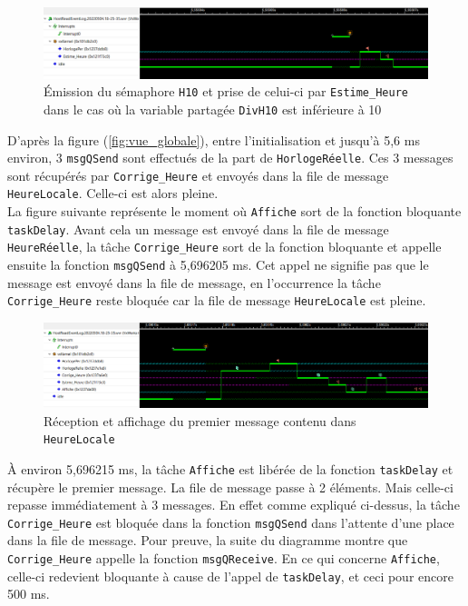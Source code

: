 \documentclass[french]{article}
\begin{document}
	\begin{figure}[H]
		\centering
		\includegraphics[width=1\linewidth]{../affichage_ralenti/estime_heure_h10_incremente.PNG}
		\caption{Émission du sémaphore \texttt{H10} et prise de celui-ci par \texttt{Estime\_Heure} dans le cas où la variable partagée \texttt{DivH10} est inférieure à 10}
		\label{fig:estime_heure_h10_incremente}
	\end{figure}

	D'après la figure (\ref{fig:vue_globale}), entre l'initialisation et jusqu'à 5,6 ms environ, 3 \texttt{msgQSend} sont effectués de la part de \texttt{HorlogeRéelle}. Ces 3 messages sont récupérés par \texttt{Corrige\_Heure} et envoyés dans la file de message \texttt{HeureLocale}. Celle-ci est alors pleine.\\
	La figure suivante représente le moment où \texttt{Affiche} sort de la fonction bloquante \texttt{taskDelay}. Avant cela un message est envoyé dans la file de message \texttt{HeureRéelle}, la tâche \texttt{Corrige\_Heure} sort de la fonction bloquante et appelle ensuite la fonction \texttt{msgQSend} à 5,696205 ms. Cet appel ne signifie pas que le message est envoyé dans la file de message, en l'occurrence la tâche \texttt{Corrige\_Heure} reste bloquée car la file de message \texttt{HeureLocale} est pleine. 

	\begin{figure}[H]
		\centering
		\includegraphics[width=1\linewidth]{../affichage_ralenti/premire_fois_affiche_recois.PNG}
		\caption{Réception et affichage du premier message contenu dans \texttt{HeureLocale}}
		\label{fig:premiere_fois_affiche_recois}
	\end{figure}

	À environ 5,696215 ms, la tâche \texttt{Affiche} est libérée de la fonction \texttt{taskDelay} et récupère le premier message. La file de message passe à 2 éléments. Mais celle-ci repasse immédiatement à 3 messages. En effet comme expliqué ci-dessus, la tâche \texttt{Corrige\_Heure} est bloquée dans la fonction \texttt{msgQSend} dans l'attente d'une place dans la file de message. Pour preuve, la suite du diagramme montre que \texttt{Corrige\_Heure} appelle la fonction \texttt{msgQReceive}. En ce qui concerne \texttt{Affiche}, celle-ci redevient bloquante à cause de l'appel de \texttt{taskDelay}, et ceci pour encore 500 ms.\\
	
\end{document}
